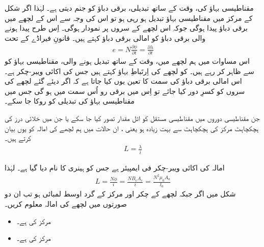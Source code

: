 مقناطیسی بہاؤ کی، وقت کے ساتھ تبدیلی، برقی دباؤ  کو جنم دیتی ہے۔ لہٰذا  اگر شکل   کے مرکز میں مقناطیسی بہاؤ تبدیل ہو رہی ہو تو اس کی وجہ سے اس کے لچھے میں برقی دباؤ پیدا ہوگی جوکہ اس لچھے کے سروں پر نمودار ہوگی۔ اِس طرح پیدا ہونے والی برقی دباؤ کو امالی برقی دباؤ  کہتے ہیں۔ قانونِ فیراڈے  کے تحت
\begin{align}\label{مساوات_مقناطیسی_دور_فیراڈے_قانون}
e=N \frac{\partial \phi}{\partial t} =\frac{\partial \lambda}{\partial t}
\end{align}
اس مساوات میں ہم لچھے میں، وقت کے ساتھ تبدیل ہونے والی، مقناطیسی بہاؤ کو  سے ظاہر کر رہے ہیں۔ کو لچھے کی اِرتَباطِ بہاؤ   کہتے ہیں جس کی اکائی ویبر-چکر  ہے۔ اس امالی برقی دباؤ  کی سمت کا تعین یوں کیا جاتا ہے کہ اگر دیئے گئے لچھے کی سروں کو کسرِ دور   کیا جائے تو اِس میں برقی رو اُس سمت میں ہو گی جس میں مقناطیسی بہاؤ کی تبدیلی کو روکا جا سکے۔ 

جن مقناطیسی دوروں میں مقناطیسی مستقل   کو اٹل مقدار تصور کیا جا سکے یا جن میں خلائی درز کی ہچکچاہٹ مرکز کی ہچکچاہٹ سے بہت زیادہ ہو یعنی  ، ان حالات میں ہم لچھے کی  امالہ   کو یوں بیان کرتے ہیں۔
\begin{align}\label{مساوات_مقناطیسی_دور_خود_امالہ_تعریف}
L=\frac{\lambda}{i}
\end{align}

امالہ کی اکائی ویبر-چکر فی ایمپیئر ہے جس کو ہینری  کا نام دیا گیا ہے۔ لہٰذا
\begin{align}
L=\frac{N \phi}{i}=\frac{N B_c A_c}{i}=\frac{N^2 \mu_0 A_a}{l_a}
\end{align}
%
شکل  میں اگر  جبکہ لچھے کے  چکر اور مرکز کے گرد اوسط لمبائی  ہو تب ان دو صورتوں میں لچھے کی امالہ معلوم کریں۔
\begin{itemize}
\item
مرکز کی  ہے۔
\item
مرکز کی  ہے۔
\end{itemize}

